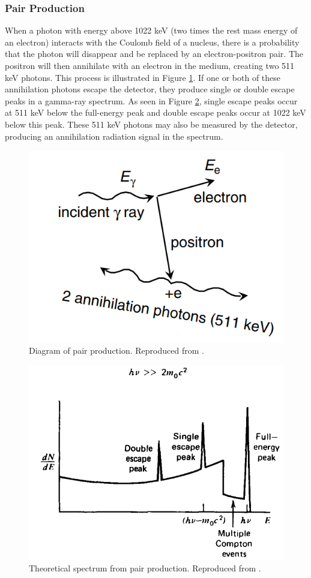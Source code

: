 \subsubsection{Pair Production}

When a photon with energy above 1022 keV (two times the rest mass energy of an electron) interacts with the Coulomb field of a nucleus, there is a probability that the photon will disappear and be replaced by an electron-positron pair. The positron will then annihilate with an electron in the medium, creating two 511 keV photons. This process is illustrated in Figure \ref{fig:pair_production}. If one or both of these annihilation photons escape the detector, they produce single or double escape peaks in a gamma-ray spectrum. As seen in Figure \ref{fig:pair_production_spectra}, single escape peaks occur at 511 keV below the full-energy peak and double escape peaks occur at 1022 keV below this peak. These 511 keV photons may also be measured by the detector, producing an annihilation radiation signal in the spectrum.

\begin{figure}[H]
\centering
\includegraphics[width=0.6\linewidth]{images/pair_production}
\caption{Diagram of pair production. Reproduced from \cite{gilmore}.}
\label{fig:pair_production}
\end{figure}

\begin{figure}[H]
\centering
\includegraphics[width=0.6\linewidth]{images/pair_production_spectra}
\caption{Theoretical spectrum from pair production. Reproduced from \cite{knoll}.}
\label{fig:pair_production_spectra}
\end{figure}


